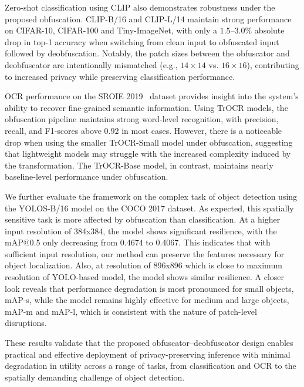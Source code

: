 \documentclass{ieeeaccess}
\begin{document}
Zero-shot classification using CLIP also demonstrates robustness under the proposed obfuscation. CLIP-B/16 and CLIP-L/14 maintain strong performance on CIFAR-10, CIFAR-100 and {Tiny-ImageNet}, with only a $1.5$–$3.0\%$ absolute drop in top-1 accuracy when switching from clean input to obfuscated input followed by deobfuscation. Notably, the patch sizes between the obfuscator and deobfuscator are intentionally mismatched (e.g., $14\times14$ vs. $16\times16$), contributing to increased privacy while preserving classification performance.

OCR performance on the SROIE 2019~\cite{Huang_2019} dataset provides insight into the system’s ability to recover fine-grained semantic information. Using TrOCR models, the obfuscation pipeline maintains strong word-level recognition, with precision, recall, and F1-scores above $0.92$ in most cases. However, there is a noticeable drop when using the smaller TrOCR-Small model under obfuscation, suggesting that lightweight models may struggle with the increased complexity induced by the transformation. The TrOCR-Base model, in contrast, maintains nearly baseline-level performance under obfuscation.

{We further evaluate the framework on the complex task of object detection using the YOLOS-B/16 model on the COCO 2017 dataset. As expected, this spatially sensitive task is more affected by obfuscation than classification. At a higher input resolution of 384x384, the model shows significant resilience, with the mAP@0.5 only decreasing from 0.4674 to 0.4067. This indicates that with sufficient input resolution, our method can preserve the features necessary for object localization. {Also, at resolution of 896x896 which is close to maximum resolution of YOLO-based model, the model shows similar resilience.} A closer look reveals that performance degradation is most pronounced for small objects, mAP-s, while the model remains highly effective for medium and large objects, mAP-m and mAP-l, which is consistent with the nature of patch-level disruptions.

These results validate that the proposed obfuscator–deobfuscator design enables practical and effective deployment of privacy-preserving inference with minimal degradation in utility across a range of tasks, from classification and OCR to the spatially demanding challenge of object detection.}
\end{document}
